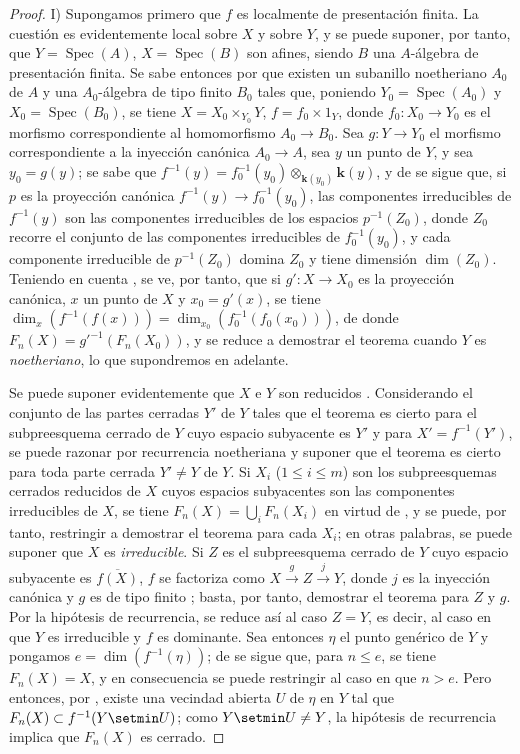 \begin{proof}
I) Supongamos primero que $f$ es localmente de presentación finita.
La cuestión es evidentemente local sobre $X$ y sobre $Y$, y se puede suponer, por tanto, que $Y=\operatorname{Spec}(A)$, $X=\operatorname{Spec}(B)$ son afines, siendo $B$ una $A$-álgebra de presentación finita.
Se sabe entonces por  que existen un subanillo noetheriano $A_0$ de $A$ y una $A_0$-álgebra de tipo finito $B_0$ tales que, poniendo $Y_0=\operatorname{Spec}(A_0)$ y $X_0=\operatorname{Spec}(B_0)$, se tiene
$X=X_0\times_{Y_0}Y$, $f=f_0\times 1_Y$,
donde $f_0:X_0\to Y_0$ es el morfismo correspondiente al homomorfismo $A_0\to B_0$.
Sea $g:Y\to Y_0$ el morfismo correspondiente a la inyección canónica $A_0\to A$, sea $y$ un punto de $Y$, y sea $y_0=g(y)$; se sabe que $f^{-1}(y)=f_0^{-1}(y_0)\otimes_{\mathbf{k}(y_0)}\boldsymbol{k}(y)$, y de  se sigue que, si $p$ es la proyección canónica $f^{-1}(y)\to f_0^{-1}(y_0)$, las componentes irreducibles de $f^{-1}(y)$ son las componentes irreducibles de los espacios $p^{-1}(Z_0)$, donde $Z_0$ recorre el conjunto de las componentes irreducibles de $f_0^{-1}(y_0)$, y cada componente irreducible de $p^{-1}(Z_0)$ domina $Z_0$ y tiene dimensión $\dim(Z_0)$.
Teniendo en cuenta , se ve, por tanto, que si $g':X\to X_0$ es la proyección canónica, $x$ un punto de $X$ y $x_0=g'(x)$, se tiene $\dim_x(f^{-1}(f(x)))=\dim_{x_0}(f_0^{-1}(f_0(x_0)))$, de donde $F_n(X)=g'^{-1}(F_n(X_0))$, y se reduce a demostrar el teorema cuando $Y$ es \emph{noetheriano}, lo que supondremos en adelante.

Se puede suponer evidentemente que $X$ e $Y$ son reducidos .
Considerando el conjunto de las partes cerradas $Y'$ de $Y$ tales que el teorema es cierto para el subpreesquema cerrado de $Y$ cuyo espacio subyacente es $Y'$ y para $X'=f^{-1}(Y')$, se puede razonar por recurrencia noetheriana  y suponer que el teorema es cierto para toda parte cerrada $Y'\neq Y$ de $Y$.
Si $X_i$ ($1\leq i\leq m$) son los subpreesquemas cerrados reducidos de $X$ cuyos espacios subyacentes son las componentes irreducibles de $X$, se tiene $F_n(X)=\bigcup_iF_n(X_i)$ en virtud de , y se puede, por tanto, restringir a demostrar el teorema para cada $X_i$; en otras palabras, se puede suponer que $X$ es \emph{irreducible}.
Si $Z$ es el subpreesquema cerrado de $Y$ cuyo espacio subyacente es $\overline{f(X)}$, $f$ se factoriza como $X\xrightarrow{g}Z\xrightarrow{j}Y$, donde $j$ es la inyección canónica  y $g$ es de tipo finito ; basta, por tanto, demostrar el teorema para $Z$ y $g$. Por la hipótesis de recurrencia, se reduce así al caso $Z=Y$, es decir, al caso en que $Y$ es irreducible y $f$ es dominante.
Sea entonces $\eta$ el punto genérico de $Y$ y pongamos $e=\dim(f^{-1}(\eta))$; de  se sigue que, para $n\leq e$, se tiene $F_n(X)=X$, y en consecuencia se puede restringir al caso en que $n>e$.
Pero entonces, por , existe una vecindad abierta $U$ de $\eta$ en $Y$ tal que $F_n(X)\subset f^{-1}(Y\setmin U)$; como $Y\setmin U\neq Y$, la hipótesis de recurrencia implica que $F_n(X)$ es cerrado.


\end{proof}
